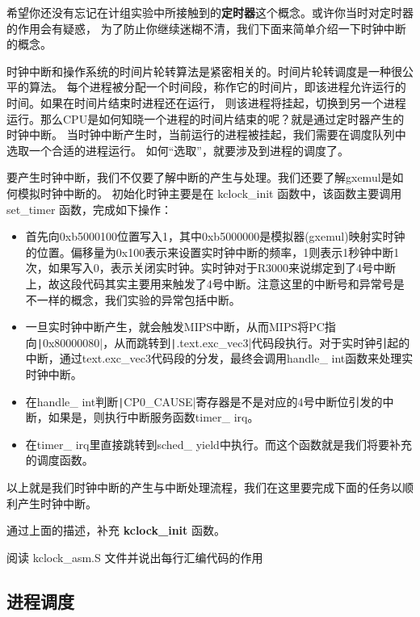 希望你还没有忘记在计组实验中所接触到的\textbf{定时器}这个概念。或许你当时对定时器的作用会有疑惑，
为了防止你继续迷糊不清，我们下面来简单介绍一下时钟中断的概念。

时钟中断和操作系统的时间片轮转算法是紧密相关的。时间片轮转调度是一种很公平的算法。
每个进程被分配一个时间段，称作它的时间片，即该进程允许运行的时间。如果在时间片结束时进程还在运行，
则该进程将挂起，切换到另一个进程运行。那么CPU是如何知晓一个进程的时间片结束的呢？就是通过定时器产生的时钟中断。
当时钟中断产生时，当前运行的进程被挂起，我们需要在调度队列中选取一个合适的进程运行。
如何“选取”，就要涉及到进程的调度了。

要产生时钟中断，我们不仅要了解中断的产生与处理。我们还要了解gxemul是如何模拟时钟中断的。
初始化时钟主要是在 kclock\_init 函数中，该函数主要调用set\_timer 函数，完成如下操作：
\begin{itemize}
  \item 首先向0xb5000100位置写入1，其中0xb5000000是模拟器(gxemul)映射实时钟的位置。偏移量为0x100表示来设置实时钟中断的频率，1则表示1秒钟中断1次，如果写入0，表示关闭实时钟。实时钟对于R3000来说绑定到了4号中断上，故这段代码其实主要用来触发了4号中断。注意这里的中断号和异常号是不一样的概念，我们实验的异常包括中断。
  \item 一旦实时钟中断产生，就会触发MIPS中断，从而MIPS将PC指向\texttt|0x80000080|，从而跳转到\texttt|.text.exc_vec3|代码段执行。对于实时钟引起的中断，通过text.exc\_vec3代码段的分发，最终会调用handle\_ int函数来处理实时钟中断。
  \item 在handle\_ int判断\texttt|CP0_CAUSE|寄存器是不是对应的4号中断位引发的中断，如果是，则执行中断服务函数timer\_ irq。
  \item 在timer\_ irq里直接跳转到sched\_ yield中执行。而这个函数就是我们将要补充的调度函数。
\end{itemize}

以上就是我们时钟中断的产生与中断处理流程，我们在这里要完成下面的任务以顺利产生时钟中断。

\begin{exercise}
通过上面的描述，补充 \textbf{ kclock\_init } 函数。
\end{exercise}

\begin{thinking}\label{think-时钟设置}
阅读 kclock\_asm.S  文件并说出每行汇编代码的作用
\end{thinking}

\subsection{进程调度}

